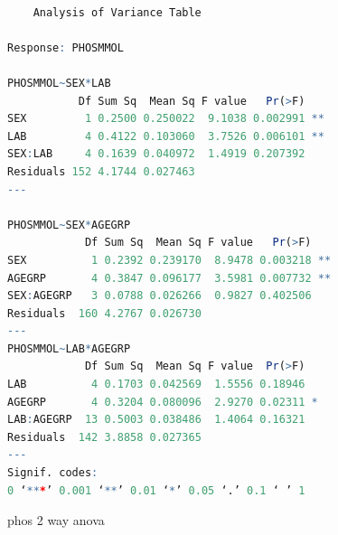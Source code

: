 \documentclass{article}
\begin{document}
  	\begin{figure}[H]
	\begin{lstlisting}[language=R]
  
    Analysis of Variance Table

Response: PHOSMMOL

PHOSMMOL~SEX*LAB
           Df Sum Sq  Mean Sq F value   Pr(>F)   
SEX         1 0.2500 0.250022  9.1038 0.002991 **
LAB         4 0.4122 0.103060  3.7526 0.006101 **
SEX:LAB     4 0.1639 0.040972  1.4919 0.207392   
Residuals 152 4.1744 0.027463                    
---                

PHOSMMOL~SEX*AGEGRP
            Df Sum Sq  Mean Sq F value   Pr(>F)   
SEX          1 0.2392 0.239170  8.9478 0.003218 **
AGEGRP       4 0.3847 0.096177  3.5981 0.007732 **
SEX:AGEGRP   3 0.0788 0.026266  0.9827 0.402506   
Residuals  160 4.2767 0.026730                
---
PHOSMMOL~LAB*AGEGRP
            Df Sum Sq  Mean Sq F value  Pr(>F)  
LAB          4 0.1703 0.042569  1.5556 0.18946  
AGEGRP       4 0.3204 0.080096  2.9270 0.02311 *
LAB:AGEGRP  13 0.5003 0.038486  1.4064 0.16321  
Residuals  142 3.8858 0.027365                  
---
Signif. codes:  
0 ‘***’ 0.001 ‘**’ 0.01 ‘*’ 0.05 ‘.’ 0.1 ‘ ’ 1
    \end{lstlisting}
    \caption{phos 2 way anova}
    \label{fig:phos2way}
    \end{figure}
    
\end{document}
